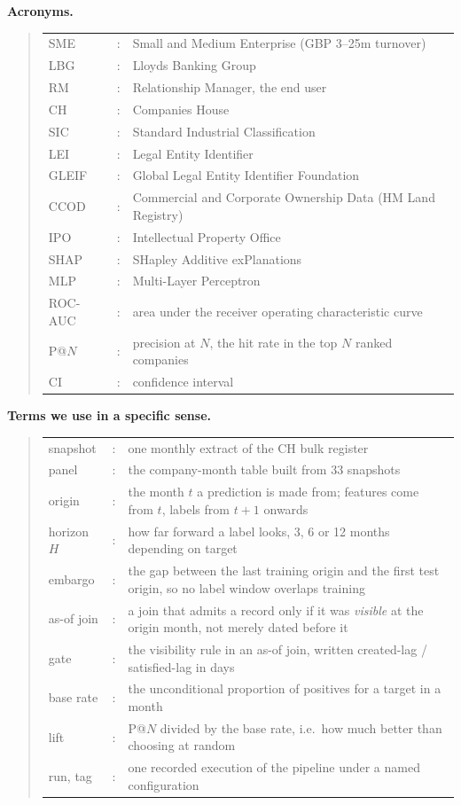 \documentclass[    author={Samuel Menon Demelo; Sneha Saphala Ram Prasad; 
Viktor Ander Lindholm; Vishal Khatri},
               supervisor={Prof. Fernando Moreno-Pino},
                   degree={MSc},
                    title={Lloyds Commercial Banking Intelligence},
                 subtitle={Ranking SME Lending, Risk and Growth Prospects for Lloyds Banking Group},
                     type={},
                     year={2026}]{dissertation}
\begin{document}
\noindent\textbf{Acronyms.}
\begin{quote}
\noindent
\begin{tabular}{lcl}
SME     &:& Small and Medium Enterprise (GBP 3--25m turnover) \\
LBG     &:& Lloyds Banking Group \\
RM      &:& Relationship Manager, the end user \\
CH      &:& Companies House \\
SIC     &:& Standard Industrial Classification \\
LEI     &:& Legal Entity Identifier \\
GLEIF   &:& Global Legal Entity Identifier Foundation \\
CCOD    &:& Commercial and Corporate Ownership Data (HM Land Registry) \\
IPO     &:& Intellectual Property Office \\
SHAP    &:& SHapley Additive exPlanations \\
MLP     &:& Multi-Layer Perceptron \\
ROC-AUC &:& area under the receiver operating characteristic curve \\
P@$N$   &:& precision at $N$, the hit rate in the top $N$ ranked companies \\
CI      &:& confidence interval \\
\end{tabular}
\end{quote}

\noindent\textbf{Terms we use in a specific sense.}
\begin{quote}
\noindent
\begin{tabular}{lcp{}}
snapshot &:& one monthly extract of the CH bulk register \\
panel    &:& the company-month table built from 33 snapshots \\
origin   &:& the month $t$ a prediction is made from; features come from $t$, labels from $t{+}1$ onwards \\
horizon $H$ &:& how far forward a label looks, 3, 6 or 12 months depending on target \\
embargo  &:& the gap between the last training origin and the first test origin, so no label window overlaps training \\
as-of join &:& a join that admits a record only if it was \emph{visible} at the origin month, not merely dated before it \\
gate     &:& the visibility rule in an as-of join, written created-lag / satisfied-lag in days \\
base rate &:& the unconditional proportion of positives for a target in a month \\
lift     &:& P@$N$ divided by the base rate, i.e.\ how much better than choosing at random \\
run, tag &:& one recorded execution of the pipeline under a named configuration \\
\end{tabular}
\end{quote}
\end{document}
